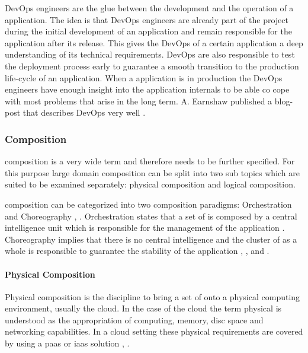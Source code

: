 DevOps engineers are the glue between the development and the operation of a
\ms{} application. The idea is that DevOps engineers are already part of the
project during the initial development of an application and remain responsible
for the application after its release. This gives the DevOps of a certain
application a deep understanding of its technical requirements. DevOps are also
responsible to test the deployment process early to guarantee a smooth
transition to the production life-cycle of an application. When a \ms{}
application is in production the DevOps engineers have enough insight into the
application internals to be able co cope with most problems that arise in the
long term. A. Earnshaw published a blog-post that describes DevOps very
well \cite{earnshaw2013devops}.

\subsubsection{\msuc{} Composition}
\label{subsub:composition}

\msuc{} composition is a very wide term and therefore needs to be further
specified. For this purpose large domain composition can be split into two sub
topics which are suited to be examined separately: physical composition and
logical composition.

\msuc{} composition can be categorized into two composition paradigms:
Orchestration and Choreography \cite{varjoinen2014orchestrationVSchoreography},
\cite{lublinsky2008orchestrationVSchoreography}. Orchestration states that a set
of \mss{} is composed by a central intelligence unit which is responsible for
the management of the application \cite{cohen2015orchestration}. Choreography
implies that there is no central intelligence and the cluster of \mss{} as a
whole is responsible to guarantee the stability of the application
\cite{millidge2015choreography}, \cite{vilas2016choreography}, and
\cite{jellema2017choreography}.

\paragraph{Physical Composition}

Physical composition is the discipline to bring a set of \mss{} onto a
physical computing environment, usually the cloud. In the case of the cloud the
term physical is understood as the appropriation of computing, memory, disc
space and networking capabilities. In a cloud setting these physical
requirements are covered by using a \gls{paas} or \gls{iaas} solution
\cite{lawton2008developing}, \cite{buyya2009modeling}.

